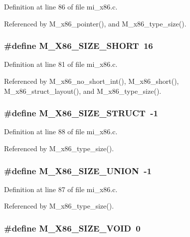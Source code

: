 Definition at line 86 of file mi\_\-x86.c.

Referenced by M\_\-x86\_\-pointer(), and M\_\-x86\_\-type\_\-size().
\subsubsection{\setlength{\rightskip}{0pt plus 5cm}\#define M\_\-X86\_\-SIZE\_\-SHORT~16}\label{mi__x86_8c_236087d7886c2cd33b0b6822d0f4e990}




Definition at line 81 of file mi\_\-x86.c.

Referenced by M\_\-x86\_\-no\_\-short\_\-int(), M\_\-x86\_\-short(), M\_\-x86\_\-struct\_\-layout(), and M\_\-x86\_\-type\_\-size().
\subsubsection{\setlength{\rightskip}{0pt plus 5cm}\#define M\_\-X86\_\-SIZE\_\-STRUCT~-1}\label{mi__x86_8c_4a1589682996bbcf51d2a2b8be228560}




Definition at line 88 of file mi\_\-x86.c.

Referenced by M\_\-x86\_\-type\_\-size().
\subsubsection{\setlength{\rightskip}{0pt plus 5cm}\#define M\_\-X86\_\-SIZE\_\-UNION~-1}\label{mi__x86_8c_fa580fcd8798f416af2bad5a64447cbb}




Definition at line 87 of file mi\_\-x86.c.

Referenced by M\_\-x86\_\-type\_\-size().
\subsubsection{\setlength{\rightskip}{0pt plus 5cm}\#define M\_\-X86\_\-SIZE\_\-VOID~0}\label{mi__x86_8c_750790c6b0985e47551e69891dd0109d}





